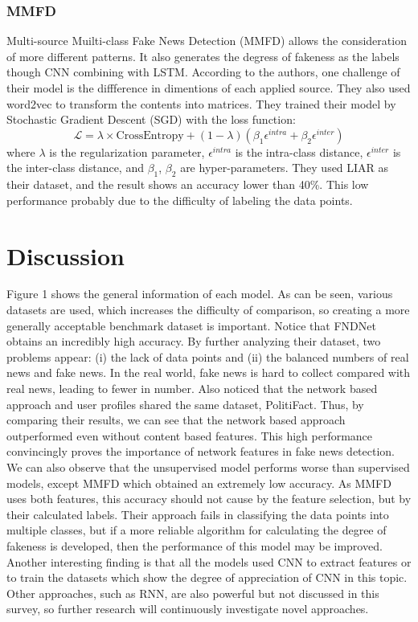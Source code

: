 \documentclass[sigconf ,nonacm]{acmart}
\begin{document}
\subsubsection{MMFD}
Multi-source Muilti-class Fake News Detection (MMFD) \cite{MMFD} allows the consideration of more different patterns. It also generates the degress of fakeness as the labels though CNN combining with LSTM. According to the authors, one challenge of their model is the diffference in dimentions of each applied source. They also used word2vec to transform the contents into matrices. They trained their model by Stochastic Gradient Descent (SGD) with the loss function:
\begin{equation*}
\mathcal{L} = \lambda\times \text{CrossEntropy} +(1-\lambda)(\beta_1\epsilon^{intra} + \beta_2\epsilon^{inter})
\end{equation*}
where $\lambda$ is the regularization parameter, $\epsilon^{intra}$ is the intra-class distance, $\epsilon^{inter}$ is the inter-class distance, and $\beta_1$, $\beta_2$ are hyper-parameters. They used LIAR as their dataset, and the result shows an accuracy lower than 40\%. This low performance probably due to the difficulty of labeling the data points.

\section{Discussion}
Figure 1 shows the general information of each model. As can be seen, various datasets are used, which increases the difficulty of comparison, so creating a more generally acceptable benchmark dataset is important. Notice that FNDNet obtains an incredibly high accuracy. By further analyzing their dataset, two problems appear: (i) the lack of data points and (ii) the balanced numbers of real news and fake news. In the real world, fake news is hard to collect compared with real news, leading to fewer in number. Also noticed that the network based approach and user profiles shared the same dataset, PolitiFact. Thus, by comparing their results, we can see that the network based approach outperformed even without content based features. This high performance convincingly proves the importance of network features in fake news detection. We can also observe that the unsupervised model performs worse than supervised models, except MMFD which obtained an extremely low accuracy. As MMFD uses both features, this accuracy should not cause by the feature selection, but by their calculated labels. Their approach fails in classifying the data points into multiple classes, but if a more reliable algorithm for calculating the degree of fakeness is developed, then the performance of this model may be improved. Another interesting finding is that all the models used CNN to extract features or to train the datasets which show the degree of appreciation of CNN in this topic. Other approaches, such as RNN, are also powerful but not discussed in this survey, so further research will continuously investigate novel approaches. 
\end{document}
